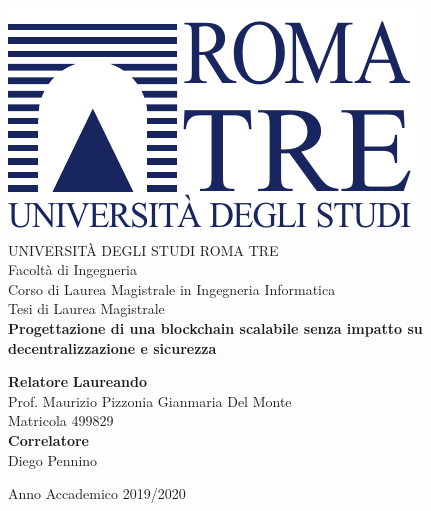 \thispagestyle{empty}
\begin{center}
	\vspace{10mm}
	{\includegraphics[width=0.4 \linewidth]{img/uniroma3-logo}} \\
	\vspace{10mm}
	{\Large UNIVERSIT\`A DEGLI STUDI ROMA TRE} \\
	\vspace{5mm}
	{\Large Facolt\`a di Ingegneria} \\
	{\Large Corso di Laurea Magistrale in Ingegneria Informatica} \\
	\vspace{15mm}
	{\Large Tesi di Laurea Magistrale} \\
	\vspace{10mm}
	{\Large \textbf{Progettazione di una blockchain scalabile senza impatto su decentralizzazione e sicurezza}} \\
	\vspace{4 cm}
\end{center}
	\noindent \textbf{Relatore} \hfill \textbf{Laureando} \\
	\noindent Prof. Maurizio Pizzonia \hfill Gianmaria Del Monte \\
	\noindent \null\hfill Matricola 499829 \\
	\noindent \textbf{Correlatore}\\
	\noindent Diego Pennino\\
	\vfill
\begin{center}
	{\large Anno Accademico 2019/2020} \\
\end{center}
\newpage